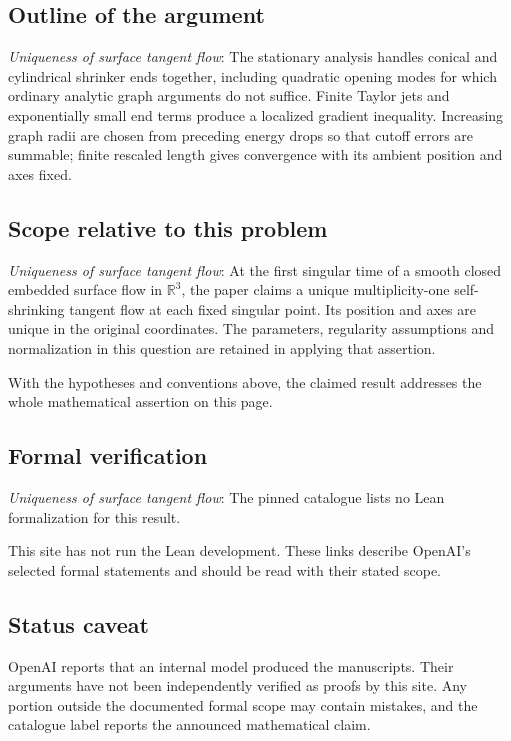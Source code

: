 \documentclass[11pt]{article}
\begin{document}
\subsection{Outline of the argument}
\textit{Uniqueness of surface tangent flow}: The stationary analysis handles conical and cylindrical shrinker ends together, including quadratic opening modes for which ordinary analytic graph arguments do not suffice. Finite Taylor jets and exponentially small end terms produce a localized gradient inequality. Increasing graph radii are chosen from preceding energy drops so that cutoff errors are summable; finite rescaled length gives convergence with its ambient position and axes fixed.

\subsection{Scope relative to this problem}
\textit{Uniqueness of surface tangent flow}: At the first singular time of a smooth closed embedded surface flow in $\mathbb R^3$, the paper claims a unique multiplicity-one self-shrinking tangent flow at each fixed singular point. Its position and axes are unique in the original coordinates. The parameters, regularity assumptions and normalization in this question are retained in applying that assertion.

With the hypotheses and conventions above, the claimed result addresses the whole mathematical assertion on this page.

\subsection{Formal verification}
\textit{Uniqueness of surface tangent flow}: The pinned catalogue lists no Lean formalization for this result.

This site has not run the Lean development. These links describe OpenAI’s selected formal statements and should be read with their stated scope.

\subsection{Status caveat}
OpenAI reports that an internal model produced the manuscripts. Their arguments have not been independently verified as proofs by this site. Any portion outside the documented formal scope may contain mistakes, and the catalogue label reports the announced mathematical claim.
\end{document}
